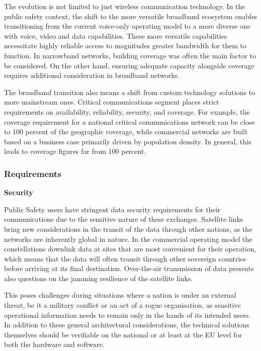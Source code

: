 \documentclass[english, 12pt, a4paper, elec, utf8, a-1b, online]{aaltothesis}
\begin{document}
The evolution is not limited to just wireless communication technology. In the public safety context, the shift to the more versatile broadband ecosystem enables transitioning from the current voice-only operating model to a more diverse one with voice, video and data capabilities. These more versatile capabilities necessitate highly reliable access to magnitudes greater bandwidth for them to function. In narrowband networks, building coverage was often the main factor to be considered. On the other hand, ensuring adequate capacity alongside coverage requires additional consideration in broadband networks.

The broadband transition also means a shift from custom technology solutions to more mainstream ones. Critical communications segment places strict requirements on availability, reliability, security, and coverage. For example, the coverage requirement for a national critical communications network can be close to 100 percent of the geographic coverage, while commercial networks are built based on a business case primarily driven by population density. In general, this leads to coverage figures far from 100 percent.

\subsubsection{Requirements}

\textbf{Security}

Public Safety users have stringent data security requirements for their communications due to the sensitive nature of these exchanges. Satellite links bring new considerations in the transit of the data through other nations, as the networks are inherently global in nature. In the commercial operating model the constellations downlink data at sites that are most convenient for their operation, which means that the data will often transit through other sovereign countries before arriving at its final destination. Over-the-air transmission of data presents also questions on the jamming resilience of the satellite links.

This poses challenges during situations where a nation is under an external threat, be it a military conflict or an act of a rogue organisation, as sensitive operational information needs to remain only in the hands of its intended users. In addition to these general architectural considerations, the technical solutions themselves should be verifiable on the national or at least at the EU level for both the hardware and software.
\end{document}
